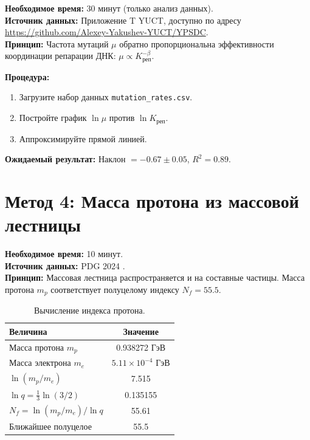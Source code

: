 \documentclass[12pt,a4paper]{article}
\begin{document}
	\textbf{Необходимое время:} 30 минут (только анализ данных).\\
	\textbf{Источник данных:} Приложение T YUCT, доступно по адресу
	\url{https://github.com/Alexey-Yakushev-YUCT/YPSDC}.\\
	\textbf{Принцип:} Частота мутаций \(\mu\) обратно пропорциональна эффективности координации
	репарации ДНК: \(\mu \propto K_{\text{реп}}^{-\beta}\).
	
	\textbf{Процедура:}
	\begin{enumerate}[label=(\arabic*)]
		\item Загрузите набор данных \texttt{mutation\_rates.csv}.
		\item Постройте график \(\ln \mu\) против \(\ln K_{\text{реп}}\).
		\item Аппроксимируйте прямой линией.
	\end{enumerate}
	
	\textbf{Ожидаемый результат:} Наклон \(= -0.67 \pm 0.05\), \(R^2 = 0.89\).
	
	\section{Метод 4: Масса протона из массовой лестницы}
	\label{sec:proton}
	
	\textbf{Необходимое время:} 10 минут.\\
	\textbf{Источник данных:} PDG 2024 \cite{PDG2024}.\\
	\textbf{Принцип:} Массовая лестница распространяется и на составные частицы.
	Масса протона \(m_p\) соответствует полуцелому индексу \(N_f = 55.5\).
	
	\begin{table}[H]
		\centering
		\caption{Вычисление индекса протона.}
		\label{tab:proton}
		\begin{tabular}{l c}
			\toprule
			Величина & Значение \\
			\midrule
			Масса протона \(m_p\) & 0.938272 ГэВ \\
			Масса электрона \(m_e\) & \(5.11\times10^{-4}\) ГэВ \\
			\(\ln(m_p/m_e)\) & 7.515 \\
			\(\ln q = \frac{1}{3}\ln(3/2)\) & 0.135155 \\
			\(N_f = \ln(m_p/m_e)/\ln q\) & 55.61 \\
			Ближайшее полуцелое & 55.5 \\
			\bottomrule
		\end{tabular}
	\end{table}
	
\end{document}
